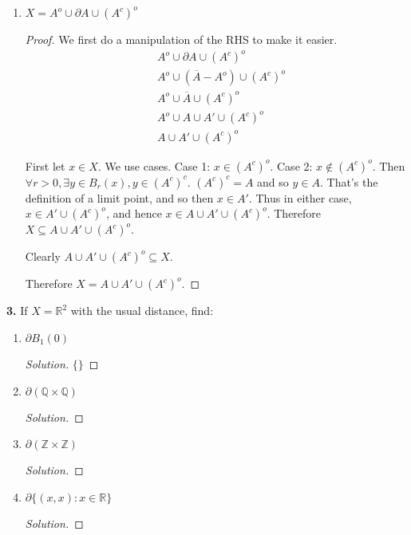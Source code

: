 \documentclass{article}
\newcommand{\R}{\mathbb{R}}
\newcommand{\Z}{\mathbb{Z}}
\newcommand{\Q}{\mathbb{Q}}
\newcommand{\ol}[1]{\overline{#1}}
\newenvironment{solution}{\begin{proof}[Solution]}{\end{proof}}
\begin{document}
\begin{enumerate}
    \item 
    $X = A^o \cup \partial A \cup (A^c)^o$
    \begin{proof}
        We first do a manipulation of the RHS to make it easier. 
        \begin{align*}
            &A^o \cup \partial A \cup (A^c)^o \\
            &A^o \cup (\ol{A} - A^o) \cup (A^c)^o \\
            &A^o \cup \ol{A} \cup (A^c)^o \\
            &A^o \cup A \cup A' \cup (A^c)^o \\
            &A \cup A' \cup (A^c)^o
        \end{align*}

        First let $x \in X$. We use cases. Case 1: $x \in (A^c)^o$. Case 2: $x \notin (A^c)^o$. Then $\forall r > 0, \exists y \in B_r(x), y \in (A^c)^c$. $(A^c)^c = A$ and so $y \in A$. That's the definition of a limit point, and so then $x \in A'$. Thus in either case, $x \in A' \cup (A^c)^o$, and hence $x \in A \cup A' \cup (A^c)^o$. Therefore $X \subseteq A \cup A' \cup (A^c)^o$.

        Clearly $A \cup A' \cup (A^c)^o \subseteq X$.

        Therefore $X = A \cup A' \cup (A^c)^o$.        
    \end{proof}
\end{enumerate}

\newpage %

\textbf{3. }
If $X = \R^2$ with the usual distance, find:

\renewcommand{\labelenumi}{(\arabic{enumi})}
\begin{enumerate}
    \item 
    $\partial B_1(0)$
    \begin{solution}
        $\{\}$

    \end{solution}


    \item 
    $\partial(\Q \times \Q)$
    \begin{solution}

    \end{solution}


    \item 
    $\partial(\Z \times \Z)$
    \begin{solution}

    \end{solution}


    \item 
    $\partial \{(x, x) : x \in \R\}$
    \begin{solution}

    \end{solution}
\end{enumerate}
\end{document}
